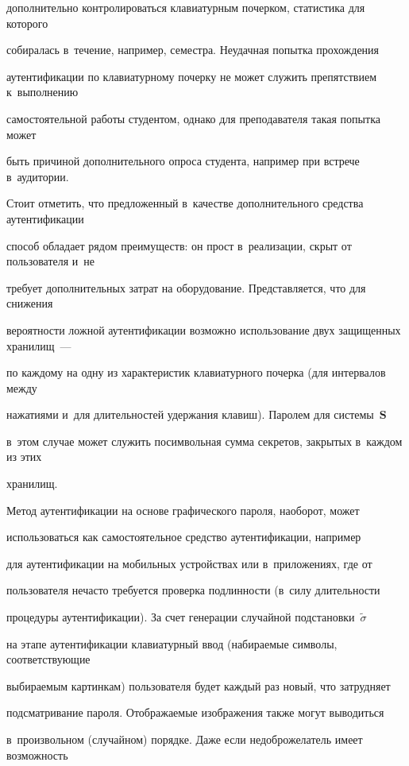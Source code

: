 дополнительно контролироваться клавиатурным почерком, статистика для которого 


собиралась в~течение, например, семестра. Неудачная попытка прохождения 


аутентификации по клавиатурному почерку не может служить препятствием к~выполнению 


самостоятельной работы студентом, однако для преподавателя такая попытка может 


быть причиной дополнительного опроса студента, например при встрече в~аудитории. 


Стоит отметить, что предложенный в~качестве дополнительного средства аутентификации 


способ обладает рядом преимуществ: он прост в~реализации, скрыт от пользователя и~не 


требует дополнительных затрат на оборудование. Представляется, что для снижения 


вероятности ложной аутентификации возможно использование двух защищенных хранилищ~--- 


по каждому на одну из характеристик клавиатурного почерка (для интервалов между 


нажатиями и~для длительностей удержания клавиш). Паролем для системы~$\mathbf{S}$ 


в~этом случае может служить посимвольная сумма секретов, закрытых в~каждом из этих 


хранилищ.





Метод аутентификации на основе графического пароля, наоборот, может 


использоваться как самостоятельное средство аутентификации, например 


для аутентификации на мобильных устройствах или в~приложениях, где от 


пользователя нечасто требуется проверка подлинности (в~силу длительности 


процедуры аутентификации). За счет генерации случайной подстановки~$\widetilde{\sigma}$ 


на этапе аутентификации клавиатурный ввод (набираемые символы, соответствующие 


выбираемым картинкам) пользователя будет каждый раз новый, что затрудняет 


подсматривание пароля. Отображаемые изображения также могут выводиться 


в~произвольном (случайном) порядке. Даже если недоброжелатель имеет возможность 


